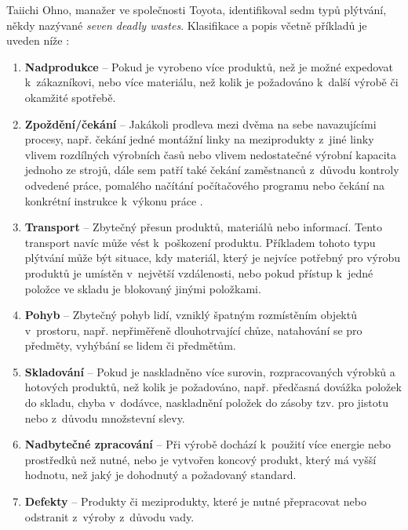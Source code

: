 Taiichi Ohno, manažer ve společnosti Toyota, identifikoval sedm typů plýtvání, někdy nazývané \emph{seven deadly wastes}. Klasifikace a popis včetně příkladů je uveden níže \cite{bib:seven}:
\begin{enumerate}
    \item \textbf{Nadprodukce} -- Pokud je vyrobeno více produktů, než je možné expedovat k~zákazníkovi, nebo více materiálu, než kolik je požadováno k~další výrobě či okamžité spotřebě.
    \item \textbf{Zpoždění/čekání} -- Jakákoli prodleva mezi dvěma na sebe navazujícími procesy, např. čekání jedné montážní linky na meziprodukty z~jiné linky vlivem rozdílných výrobních časů nebo vlivem nedostatečné výrobní kapacita jednoho ze strojů, dále sem patří také čekání zaměstnanců z~důvodu kontroly odvedené práce, pomalého načítání počítačového programu nebo čekání na konkrétní instrukce k~výkonu práce \cite{bib:LW1}.
    \item \textbf{Transport} -- Zbytečný přesun produktů, materiálů nebo informací. Tento transport navíc může vést k~poškození produktu. Příkladem tohoto typu plýtvání může být situace, kdy materiál, který je nejvíce potřebný pro výrobu produktů je umístěn v~největší vzdálenosti, nebo pokud přístup k~jedné položce ve skladu je blokovaný jinými položkami.
    \item \textbf{Pohyb} -- Zbytečný pohyb lidí, vzniklý špatným rozmístěním objektů v~prostoru, např. nepřiměřeně dlouhotrvající chůze, natahování se pro předměty, vyhýbání se lidem či předmětům. 
    \item \textbf{Skladování} -- Pokud je naskladněno více surovin, rozpracovaných výrobků a hotových produktů, než kolik je požadováno, např. předčasná dovážka položek do skladu, chyba v~dodávce, naskladnění položek do zásoby tzv. pro jistotu nebo z~důvodu množstevní slevy.
    \item \textbf{Nadbytečné zpracování} -- Při výrobě dochází k~použití více energie nebo prostředků než nutné, nebo je vytvořen koncový produkt, který má vyšší hodnotu, než jaký je dohodnutý a požadovaný standard. 
    \item \textbf{Defekty} -- Produkty či meziprodukty, které je nutné přepracovat nebo odstranit z~výroby z~důvodu vady. 
\end{enumerate}

